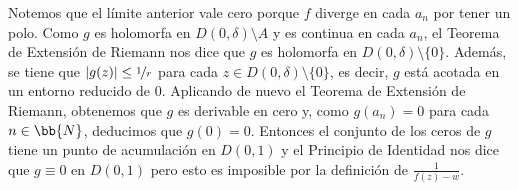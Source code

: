 \documentclass[12pt]{article}
\begin{document}
\begin{ejercicio}[2.5 puntos]
\begin{enumerate}
            Notemos que el límite anterior vale cero porque $f$ diverge en cada $a_n$ por tener un polo. Como $g$ es holomorfa en $D(0, \delta) \setminus A$ y es continua en cada $a_n$, el Teorema de Extensión de Riemann nos dice que $g$ es holomorfa en $D(0, \delta)\setminus \{0\}$. Además, se tiene que $|g(z)| \leq \nicefrac{1}{r}$ para cada $z \in D(0, \delta)\setminus \{0\}$, es decir, $g$ está acotada en un entorno reducido de $0$. Aplicando de nuevo el Teorema de Extensión de Riemann, obtenemos que $g$ es derivable en cero y, como $g(a_n) = 0$ para cada $n \in \bb{N}$, deducimos que $g(0) = 0$. Entonces el conjunto de los ceros de $g$ tiene un punto de acumulación en $D(0, 1)$ y el Principio de Identidad nos dice que $g \equiv 0$ en $D(0, 1)$ pero esto es imposible por la definición de $\frac{1}{f(z) - w}$.
        \end{enumerate}
    \end{ejercicio}
\end{document}
